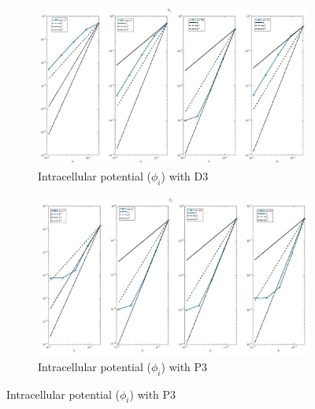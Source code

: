 \documentclass[a4paper,11pt]{article}
\begin{document}
\begin{figure}[H]
\caption{Comparison of the intracellular potential ($\phi_i$)}
\label{phii_3}
\begin{subfigure}{\textwidth}
\begin{center}
\includegraphics[width = \textwidth]{./D3_Phii_1.jpg}
\caption{Intracellular potential ($\phi_i$) with D3}
\end{center}
\end{subfigure}
\begin{subfigure}{\textwidth}
\begin{center}
\includegraphics[width =\textwidth]{./P3_Phii_1.jpg}
\caption{Intracellular potential ($\phi_i$) with P3}
\end{center}
\end{subfigure}
\end{figure}
\end{document}
